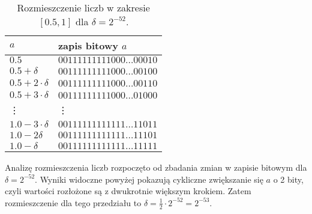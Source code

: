 \documentclass{classrep}
\begin{document}
\begin{enumerate}
			\begin{table}[!h]
        		\centering
        		\footnotesize
            	\begin{tabular}{ll} \toprule
                	$a$ & {zapis bitowy $a$} \\ \midrule
                	$0.5$ & $00111111111000\dots00010$ \\ 
 					$0.5+\delta$ & $00111111111000\dots00100$ \\
 					$0.5+2\cdot\delta$ & $00111111111000\dots00110$ \\
 					$0.5+3\cdot\delta$ & $00111111111000\dots01000$  \\
 					\vdots & \vdots \\
 					$1.0-3\cdot\delta$ & $00111111111111\dots11011$ \\
 					$1.0-2\delta$ & $00111111111111\dots11101$ \\
 					$1.0-\delta$ & $00111111111111\dots11111$ \\\bottomrule
            	\end{tabular}
            	\caption{Rozmieszczenie liczb w zakresie $[0.5,1]$ dla $\delta = 2^{-52}$.}
			\label{table:6}
   			\end{table}
			
			Analizę rozmieszczenia liczb rozpoczęto od zbadania zmian w zapisie bitowym dla $\delta = 2^{-52}$. Wyniki 
			widoczne powyżej pokazują cykliczne zwiększanie się $a$ o 2 bity, czyli wartości rozłożone są z dwukrotnie 
			większym krokiem. Zatem rozmieszczenie dla tego przedziału to $\delta = \frac{1}{2} \cdot 2^{-52} = 2^{-53}$.
			\newline
				

\end{enumerate}
\end{document}
